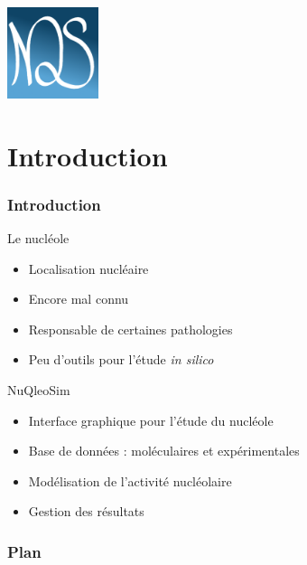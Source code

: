 \documentclass{beamer}
\begin{document}
\begin{frame}
   \begin{center}
     \includegraphics[width=0.2\textwidth]{logo/logo.png}
   \end{center}
  \titlepage
\end{frame}


\section*{Introduction}

\begin{frame}
  \frametitle{Introduction}

  \begin{block}{Le nucléole}
    \begin{itemize}
    \item Localisation nucléaire 
    \item Encore mal connu
    \item Responsable de certaines pathologies
    \item Peu d'outils pour l'étude \textit{in silico}
    \end{itemize}
  \end{block}

  \begin{block}{NuQleoSim}
    \begin{itemize}
    \item Interface graphique pour l'étude du nucléole
    \item Base de données : moléculaires et expérimentales
    \item Modélisation de l'activité nucléolaire
    \item Gestion des résultats
    \end{itemize}
  \end{block}

\end{frame}

\begin{frame}
  \frametitle{Plan}
  \tableofcontents
\end{frame}
\end{document}
